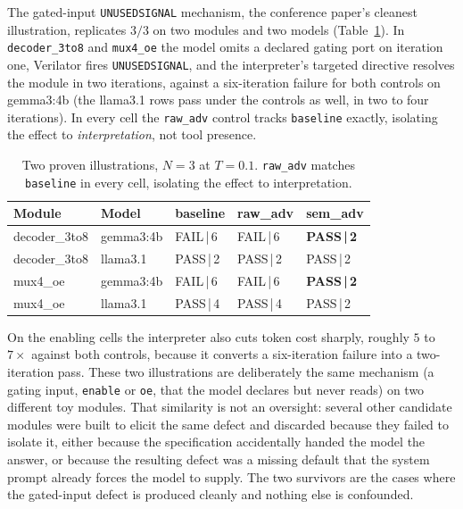 \documentclass[11pt]{article}
\begin{document}
The gated-input \texttt{UNUSEDSIGNAL} mechanism, the conference paper's
cleanest illustration, replicates $3/3$ on two modules and two models
(Table~\ref{tab:proven}). In \texttt{decoder\_3to8} and \texttt{mux4\_oe} the
model omits a declared gating port on iteration one, Verilator fires
\texttt{UNUSEDSIGNAL}, and the interpreter's targeted directive resolves the
module in two iterations, against a six-iteration failure for both controls on
gemma3:4b (the llama3.1 rows pass under the controls as well, in two to four
iterations). In every cell the \texttt{raw\_adv} control tracks
\texttt{baseline} exactly, isolating the effect to \emph{interpretation}, not
tool presence.

\begin{table}[htbp]
\centering
\caption{Two proven illustrations, $N{=}3$ at $T{=}0.1$.
\texttt{raw\_adv} matches \texttt{baseline} in every cell, isolating the
effect to interpretation.}
\label{tab:proven}
\small
\begin{tabularx}{\linewidth}{@{} l l X X X @{}}
\toprule
\textbf{Module} & \textbf{Model} & \textbf{baseline} & \textbf{raw\_adv} & \textbf{sem\_adv} \\
\midrule
decoder\_3to8 & gemma3:4b & FAIL\,|\,6 & FAIL\,|\,6 & \textbf{PASS\,|\,2} \\
decoder\_3to8 & llama3.1  & PASS\,|\,2 & PASS\,|\,2 & PASS\,|\,2 \\
mux4\_oe      & gemma3:4b & FAIL\,|\,6 & FAIL\,|\,6 & \textbf{PASS\,|\,2} \\
mux4\_oe      & llama3.1  & PASS\,|\,4 & PASS\,|\,4 & PASS\,|\,2 \\
\bottomrule
\end{tabularx}
\end{table}

On the enabling cells the interpreter also cuts token cost sharply, roughly
$5$ to $7\times$ against both controls, because it converts a six-iteration
failure into a two-iteration pass. These two illustrations are deliberately
the same mechanism (a gating input, \texttt{enable} or \texttt{oe}, that the
model declares but never reads) on two different toy modules. That similarity
is not an oversight: several other candidate modules were built to elicit the
same defect and discarded because they failed to isolate it, either because
the specification accidentally handed the model the answer, or because the
resulting defect was a missing default that the system prompt already forces
the model to supply. The two survivors are the cases where the gated-input
defect is produced cleanly and nothing else is confounded.
\end{document}
